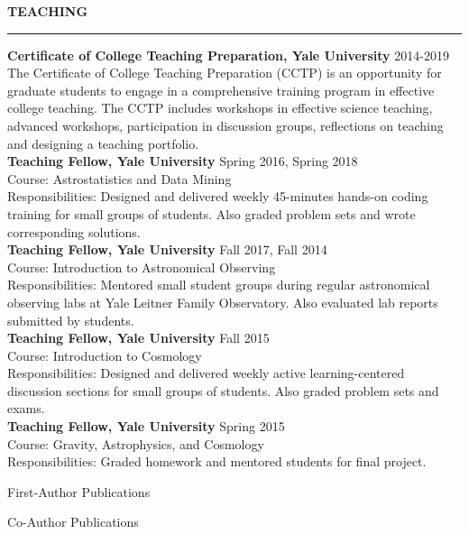 \documentclass[11pt]{article}
\renewenvironment{section}[1]
  {
  \medskip
  {\color{yaleblue} \MakeUppercase{\bf #1}}
  \smallskip
  \hrule
  \medskip
  \begin{adjustwidth}{0.3cm}{}
  }
  {
  \end{adjustwidth}
  }
\newenvironment{ref-section}[1]
  {
  \medskip
  {\color{yaleblue} \MakeUppercase{\bf #1}}
  \smallskip
  \hrule
  \medskip
  \begin{refsection}
  }
  {
  \end{refsection}
  }
\newcommand{\entry}[3]{{\bf #1} \hfill {#2} \\ {#3}}
\begin{document}
\begin{section}{Teaching}
  \entry{Certificate of College Teaching Preparation, Yale University}{2014-2019}{The Certificate of College Teaching Preparation (CCTP) is an opportunity for graduate students to engage in a comprehensive training program in effective college teaching. The CCTP includes workshops in effective science teaching, advanced workshops, participation in discussion groups, reflections on teaching and designing a teaching portfolio.} \medskip \\
  \entry{Teaching Fellow, Yale University}{Spring 2016, Spring 2018}{Course: Astrostatistics and Data Mining\\ Responsibilities: Designed and delivered weekly 45-minutes hands-on coding training for small groups of students. Also graded problem sets and wrote corresponding solutions.} \medskip \\
  \entry{Teaching Fellow, Yale University}{Fall 2017, Fall 2014}{Course: Introduction to Astronomical Observing\\ Responsibilities: Mentored small student groups during regular astronomical observing labs at Yale Leitner Family Observatory. Also evaluated lab reports submitted by students.} \medskip \\
  \entry{Teaching Fellow, Yale University}{Fall 2015}{Course: Introduction to Cosmology\\ Responsibilities: Designed and delivered weekly active learning-centered discussion sections for small groups of students. Also graded problem sets and exams.} \medskip \\
  \entry{Teaching Fellow, Yale University}{Spring 2015}{Course: Gravity, Astrophysics, and Cosmology\\ Responsibilities: Graded homework and mentored students for final project.}
\end{section}

\begin{ref-section}{First-Author Publications}
  \nocite{Lange2022_MNRAS_509_1779, Lange2021_MNRAS_502_2074, Lange2019_MNRAS_490_1870, Lange2019_MNRAS_488_5771, Lange2019_MNRAS_487_3112, Lange2019_MNRAS_482_4824, Lange2018_MNRAS_473_2830, Lange2016_ApJ_819_4, Lange2015_MNRAS_447_939, Lange2013_AA_551_89}
  \printbibliography[heading=none]
\end{ref-section}

\begin{ref-section}{Co-Author Publications}
  \nocite{Abareshi2022_arXiv_2205_0939, Dawson2022_arXiv_2203_7291, Ruggeri2022_arXiv_2208_1031, Wang2022_arXiv_2204_5332, Leauthaud2022_MNRAS_510_6150, Huang2022_MNRAS_tmp_1843, Xhakaj2022_MNRAS_514_2876, Wang2020_MNRAS_498_4450, vandenBosch2019_MNRAS_488_4984, Wang2019_MNRAS_488_3541, Zentner2019_MNRAS_485_1196, Villarreal2017_MNRAS_472_1088, Campbell2018_MNRAS_477_359, Momcheva2016_ApJS_225_27, Nelson2016_ApJ_828_27}
  \printbibliography[heading=none]
\end{ref-section}
\end{document}
